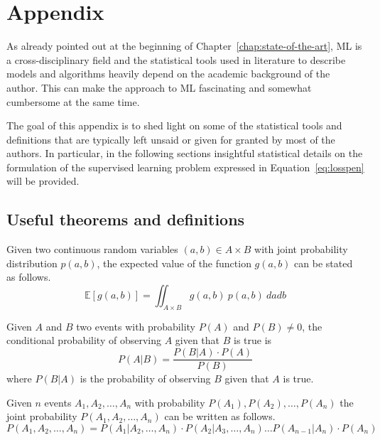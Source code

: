 \appendix

\chapter{Appendix} \label{appendix:A}
As already pointed out at the beginning of Chapter~\ref{chap:state-of-the-art}, ML is a cross-disciplinary field and the statistical tools used in literature to describe models and algorithms heavily depend on the academic background of the author. This can make the approach to ML fascinating and somewhat cumbersome at the same time.

The goal of this appendix is to shed light on some of the statistical tools and definitions that are typically left unsaid or given for granted by most of the authors. In particular, in the following sections insightful statistical details on the formulation of the supervised learning problem expressed in Equation~\eqref{eq:losspen} will be provided.


\section{Useful theorems and definitions}

\begin{theorem} \label{th:lotus}
	Given two continuous random variables $(a,b) \in A \times B$ with joint probability distribution $p(a,b)$, the expected value of the function $g(a,b)$ can be stated as follows.
	$$\mathbb{E}[g(a,b)]=\iint_{A \times B}g(a,b)~p(a,b)~dadb$$
\end{theorem}

\begin{theorem} \label{th:bayes_rule}
	Given $A$ and $B$ two events with probability $P(A)$ and $P(B) \neq 0$, the conditional probability of observing $A$ given that $B$ is true is
	$$P(A|B) = \frac{P(B|A) \cdot P(A)}{P(B)}$$
	where $P(B|A)$ is the probability of observing $B$ given that $A$ is true.
\end{theorem}

\begin{theorem} \label{th:chain_rule}
	Given $n$ events $A_1, A_2, \dots, A_n$ with probability $P(A_1), P(A_2), \dots, P(A_n)$ the joint probability $P(A_1, A_2, \dots, A_n)$ can be written as follows.
	$$P(A_1, A_2, \dots, A_n) = P(A_1|A_2, \dots, A_n) \cdot P(A_2|A_3, \dots, A_n) \dots P(A_{n-1}|A_{n}) \cdot P(A_n)$$
\end{theorem}

